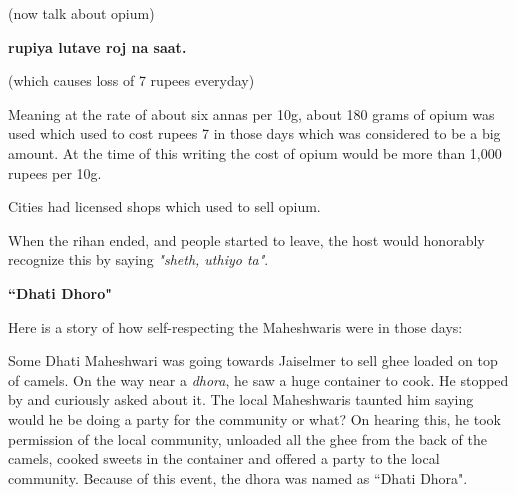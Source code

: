 (now talk about opium)

\textbf{rupiya lutave roj na saat.}

(which causes loss of 7 rupees everyday)

Meaning at the rate of about six annas per 10g, about 180 grams of opium was
used which used to cost rupees 7 in those days which was considered to be a big
amount. At the time of this writing the cost of opium would be more than 1,000
rupees per 10g.

Cities had licensed shops which used to sell opium.

When the rihan ended, and people started to leave, the host would honorably
recognize this by saying \textit{"sheth, uthiyo ta"}.

\begin{framed}
\begin{center}\textbf{``Dhati Dhoro"}\end{center}
Here is a story of how self-respecting the Maheshwaris were in those days:

Some Dhati Maheshwari was going towards Jaiselmer to sell ghee loaded on top of
camels. On the way near a \textit{dhora}, he saw a huge container to cook. He
stopped by and curiously asked about it. The local Maheshwaris taunted him
saying would he be doing a party for the community or what? On hearing this, he
took permission of the local community, unloaded all the ghee from the back of
the camels, cooked sweets in the container and offered a party to the local
community. Because of this event, the dhora was named as ``Dhati Dhora".

\end{framed}
